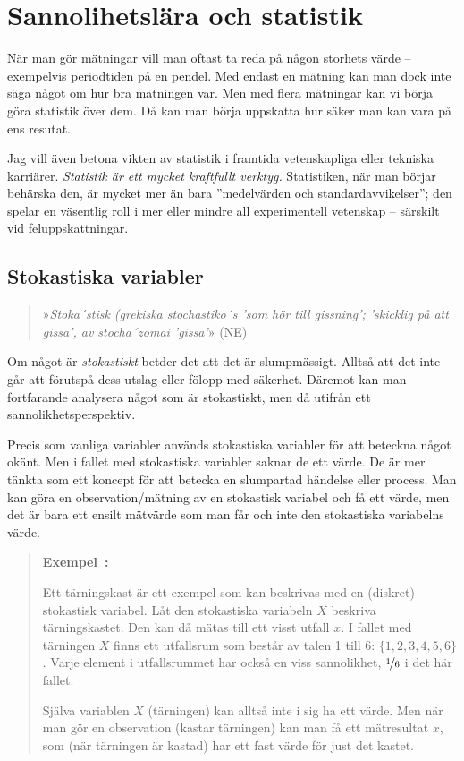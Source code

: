 \documentclass[11pt,a4paper, swedish
]{article}
\newcounter{exempel_counter}%
\newenvironment{exempel}
{
  \refstepcounter{exempel_counter}
  \begin{quote}
  \noindent\textbf{Exempel~\arabic{exempel_counter}:}
}{
  \end{quote}
}
\begin{document}
\section{Sannolihetslära och statistik}\label{sec:statistik}
När man gör mätningar vill man oftast ta reda på någon storhets värde
-- exempelvis periodtiden på en pendel. Med endast en mätning kan man
dock inte säga något om hur bra mätningen var. Men med flera mätningar
kan vi börja göra statistik över dem. Då kan man börja uppskatta hur
säker man kan vara på ens resutat.

Jag vill även betona vikten av statistik i framtida vetenskapliga eller
tekniska karriärer. \emph{Statistik är ett mycket kraftfullt verktyg.}
Statistiken, när man börjar behärska den, är mycket mer än bara
''medelvärden och standardavvikelser''; den spelar en väsentlig roll i
mer eller mindre all experimentell vetenskap -- särskilt vid
feluppskattningar. 

\subsection{Stokastiska variabler}
\begin{quote}
»{\it Stoka\!´stisk (grekiska stochastiko\!´s 'som hör till gissning';
  'skicklig på att gissa', av stocha\!´zomai 'gissa'}» (NE)
\end{quote}
Om något är \emph{stokastiskt} betder det att det är
slumpmässigt. Alltså att det inte går att förutspå dess utslag eller
fölopp med säkerhet. Däremot kan man fortfarande analysera något som
är stokastiskt, men då utifrån ett sannolikhetsperspektiv. 

Precis som vanliga variabler används stokastiska variabler för att
beteckna något okänt. Men i fallet med stokastiska variabler saknar de
ett värde. De är mer tänkta som ett koncept för att betecka en
slumpartad händelse eller process. Man kan göra en observation/mätning
av en stokastisk variabel och få ett värde, men det är bara ett ensilt 
mätvärde som man får och inte den stokastiska variabelns värde. 

\begin{exempel}
Ett tärningskast är ett exempel som kan beskrivas med en (diskret)
stokastisk variabel. Låt den stokastiska variabeln $X$ beskriva
tärningskastet. Den kan då mätas till ett visst utfall 
$x$. I fallet med tärningen $X$ finns ett utfallsrum som består av
talen 1 till 6: $\{1, 2, 3, 4, 5, 6\}$. Varje element i utfallsrummet
har också en viss sannolikhet, $\nicefrac{1}{6}$ i det här fallet.
 
Själva variablen $X$ (tärningen) kan alltså inte i sig ha ett värde.
Men när man gör en observation (kastar tärningen) kan man få ett
mätresultat $x$, som (när tärningen är kastad) har ett fast värde för
just det kastet. 
\end{exempel}
\end{document}
